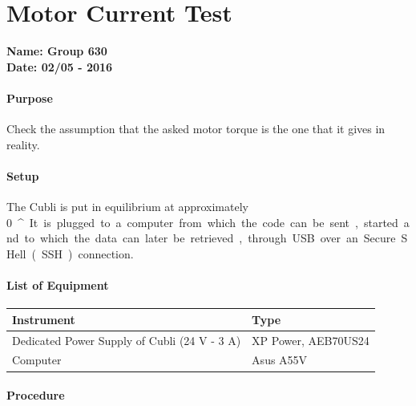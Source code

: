 \chapter{Motor Current Test} \label{app:motorCurrentTest}
\textbf{Name: Group 630}\\
\textbf{Date: 02/05 - 2016}

\subsubsection{Purpose}
Check the assumption that the asked motor torque is the one that it gives in reality.

\subsubsection{Setup}
The Cubli is put in equilibrium at approximately \SI{0}{^{\circ}}. 
It is plugged to a computer from which the code can be sent, started and to which the data can later be retrieved, through USB over an Secure SHell (SSH) connection.

\subsubsection{List of Equipment}
\begin{table}[H]
\begin{tabular}{|p{10cm}|p{4cm}|}
\hline%
  \textbf{Instrument}                &  \textbf{Type} \\
\hline%
  Dedicated Power Supply of Cubli \small{(24 V - 3 A)} & XP Power, AEB70US24 \\
\hline%
  Computer                           &  Asus A55V  \\
\hline%

\end{tabular}
\end{table}

\subsubsection{Procedure}

